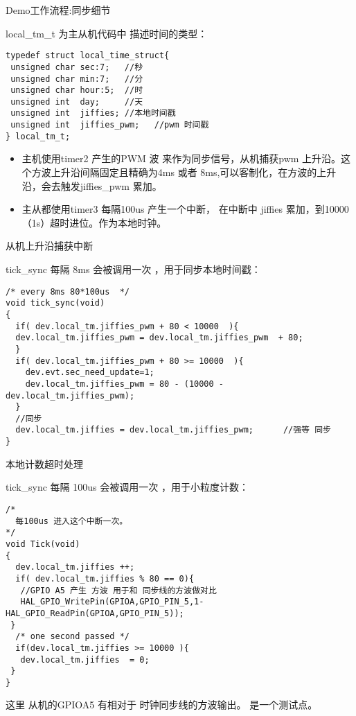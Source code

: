 \begin{frame}[fragile]{Demo工作流程:同步细节}

local\_tm\_t 为主从机代码中 描述时间的类型：
\begin{lstlisting}
typedef struct local_time_struct{
 unsigned char sec:7;   //秒
 unsigned char min:7;   //分
 unsigned char hour:5;  //时
 unsigned int  day;     //天
 unsigned int  jiffies; //本地时间戳
 unsigned int  jiffies_pwm;   //pwm 时间戳
} local_tm_t;
\end{lstlisting}


\begin{itemize}
  \item 主机使用timer2 产生的PWM 波 来作为同步信号，从机捕获pwm 上升沿。这个方波上升沿间隔固定且精确为4ms 或者 8ms,可以客制化，在方波的上升沿，会去触发jiffies\_pwm 累加。
  \item 主从都使用timer3 每隔100us 产生一个中断，  在中断中 jiffies 累加，到10000（1s）超时进位。作为本地时钟。
\end{itemize}

\end{frame}



\begin{frame}[fragile]{从机上升沿捕获中断}

tick\_sync 每隔 8ms 会被调用一次 ，用于同步本地时间戳：
\begin{lstlisting}
/* every 8ms 80*100us  */
void tick_sync(void)
{
  if( dev.local_tm.jiffies_pwm + 80 < 10000  ){
  dev.local_tm.jiffies_pwm = dev.local_tm.jiffies_pwm  + 80;
  }
  if( dev.local_tm.jiffies_pwm + 80 >= 10000  ){
    dev.evt.sec_need_update=1;
    dev.local_tm.jiffies_pwm = 80 - (10000 - dev.local_tm.jiffies_pwm);
  }
  //同步
  dev.local_tm.jiffies = dev.local_tm.jiffies_pwm;		//强等 同步
}
\end{lstlisting}

\end{frame}



\begin{frame}[fragile]{本地计数超时处理}

tick\_sync 每隔 100us 会被调用一次 ，用于小粒度计数：
\begin{lstlisting}
/*
  每100us 进入这个中断一次。
*/
void Tick(void)
{
  dev.local_tm.jiffies ++;
  if( dev.local_tm.jiffies % 80 == 0){
   //GPIO A5 产生 方波 用于和 同步线的方波做对比
   HAL_GPIO_WritePin(GPIOA,GPIO_PIN_5,1-HAL_GPIO_ReadPin(GPIOA,GPIO_PIN_5));
 }
  /* one second passed */
  if(dev.local_tm.jiffies >= 10000 ){
   dev.local_tm.jiffies  = 0;
 }
}
\end{lstlisting}

这里 从机的GPIOA5 有相对于 时钟同步线的方波输出。 是一个测试点。
\end{frame}

